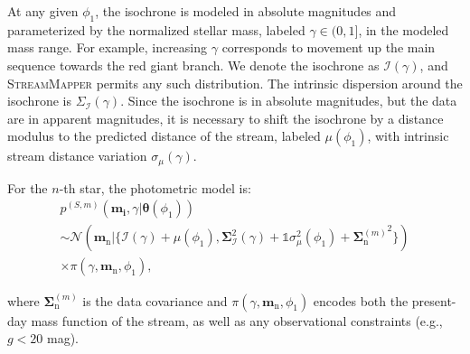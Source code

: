 \documentclass[twocolumn]{aastex631}
\newcommand{\code}[1]{\textsc{#1}}
\newcommand{\package}[1]{\code{#1}}
\newcommand{\mrm}[1]{\mathrm{#1}}
\newcommand{\mbs}[1]{\boldsymbol{#1}}
\newcommand{\mcal}[1]{\mathcal{#1}}
\newcommand{\pdf}{p}
\newcommand{\prior}{\mcal{\pi}}
\newcommand{\nth}[1]{{#1}_{\mrm{n}}}  %
\newcommand{\smallcomponent}[2]{#2^{\scriptscriptstyle (#1)}}
\newcommand{\cmp}[2]{\smallcomponent{#1}{#2}}
\begin{document}
            At any given $\phi_1$, the isochrone is modeled in absolute
            magnitudes and parameterized by the normalized stellar mass, labeled
            $\gamma \in (0, 1]$, in the modeled mass range. For example,
            increasing $\gamma$ corresponds to movement up the main sequence
            towards the red giant branch. We denote the isochrone as
            $\mcal{I(\gamma)}$, and \package{StreamMapper} permits any such
            distribution. The intrinsic dispersion around the isochrone is
            $\Sigma_\mcal{I}(\gamma)$. Since the isochrone is in absolute
            magnitudes, but the data are in apparent magnitudes, it is necessary
            to shift the isochrone by a distance modulus to the predicted
            distance of the stream, labeled  $\mu(\phi_1)$, with intrinsic
            stream distance variation $\sigma_\mu(\gamma)$.
            
            For the $n$-th star, the photometric model is:
            \begin{multline} \label{eq:photometric_probability_point}
                \cmp{S,m}{\pdf}(\mbs{m_i}, \gamma | \mbs{\theta}(\phi_1)) 
                \\ \sim \mcal{N}(\nth{\mbs{m}} | \{\mcal{I(\gamma)} + \mu(\phi_1), \mbs{\Sigma}_{\mcal{I}}^2(\gamma) + \mathds{1} \sigma_\mu^2(\phi_1) + {\cmp{m}{\nth{\mbs{\Sigma}}}}^2 \}) \\ \times \prior(\gamma, \nth{\mbs{m}}, \phi_1),
            \end{multline}
    
            where $\cmp{m}{\nth{\mbs{\Sigma}}}$ is the data covariance and
            $\prior(\gamma, \nth{\mbs{m}}, \phi_1)$ encodes both the present-day
            mass function of the stream, as well as any observational
            constraints (e.g., $g < 20$ mag).
\end{document}
